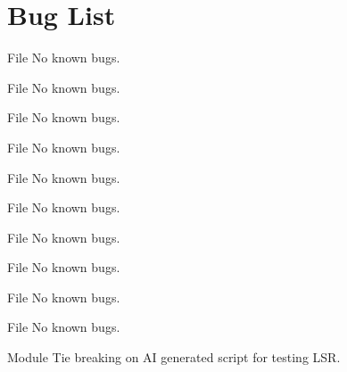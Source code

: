 \chapter{Bug List}
\hypertarget{bug}{}\label{bug}

\begin{DoxyRefList}
\item[File \doxylink{_distance_vector_network_8py}{Distance\+Vector\+Network.py} ]\label{bug__bug000001}%
%
No known bugs.  
\item[File \doxylink{_distance_vector_router_8py}{Distance\+Vector\+Router.py} ]\label{bug__bug000002}%
%
No known bugs.  
\item[File \doxylink{dvr_8py}{dvr.py} ]\label{bug__bug000003}%
%
No known bugs.  
\item[File \doxylink{_link_state_network_8py}{Link\+State\+Network.py} ]\label{bug__bug000004}%
%
No known bugs.  
\item[File \doxylink{_link_state_router_8py}{Link\+State\+Router.py} ]\label{bug__bug000005}%
%
No known bugs.  
\item[File \doxylink{lsr_8py}{lsr.py} ]\label{bug__bug000006}%
%
No known bugs.  
\item[File \doxylink{_network_8py}{Network.py} ]\label{bug__bug000007}%
%
No known bugs.  
\item[File \doxylink{_router_8py}{Router.py} ]\label{bug__bug000008}%
%
No known bugs.  
\item[File \doxylink{test__dvr_8py}{test\+\_\+dvr.py} ]\label{bug__bug000010}%
%
No known bugs.  
\item[File \doxylink{test__lsr_8py}{test\+\_\+lsr.py} ]\label{bug__bug000011}%
%
No known bugs.  
\item[Module \doxylink{group___tests}{Tests} ]\label{bug__bug000009}%
%
Tie breaking on AI generated script for testing LSR.   


\end{DoxyRefList}
